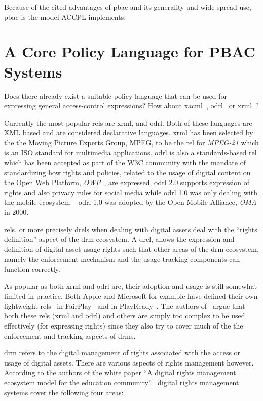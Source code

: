 \documentclass[runningheads,a4paper]{llncs}
\begin{document}
Because of the cited advantages of \ac{pbac} and its generality and wide spread use, \ac{pbac} is the model \ac{ACCPL} implements.

\section{A Core Policy Language for PBAC Systems} 

Does there already exist a suitable policy language that can be used for expressing general access-control expressions? How about \ac{xacml}~\cite{xacml3pdf}, \ac{odrl}~\cite{odrloneone} or \ac{xrml}~\cite{Wang}? 

Currently the most popular \ac{rel}s are \ac{xrml}, and \ac{odrl}. Both of these languages are XML based and are considered declarative languages. \ac{xrml} has been selected by the the Moving Picture Experts Group, MPEG, to be the \ac{rel} for \emph{MPEG-21} which is an ISO standard for multimedia applications. \ac{odrl} is also a standards-based \ac{rel} which has been accepted as part of the W3C community with the mandate of standardizing how rights and policies, related to the usage of digital content on the Open Web Platform, \emph{OWP}~\cite{openwebplatform}, are expressed. \ac{odrl} 2.0 supports expression of rights and also privacy rules for social media while \ac{odrl} 1.0 was only dealing with the mobile ecosystem -- \ac{odrl} 1.0 was adopted by the Open Mobile Alliance, \emph{OMA} in 2000.

\ac{rel}s, or more precisely \ac{drel}s when dealing with digital assets deal with the ``rights definition'' aspect of the \ac{drm} ecosystem. A \ac{drel}, allows the expression and definition of digital asset usage rights such that other areas of the \ac{drm} ecosystem, namely the enforcement mechanism and the usage tracking components can function correctly.

As popular as both \ac{xrml} and \ac{odrl} are, their adoption and usage is still somewhat limited in practice. Both Apple and Microsoft for example have defined their own lightweight \ac{rel}s~\cite{problemwithrels} in FairPlay~\cite{fairplay} and in PlayReady~\cite{playready}. The authors of~\cite{problemwithrels} argue that both these \ac{rel}s (\ac{xrml} and \ac{odrl}) and others are simply too complex to be used effectively (for expressing rights) since they also try to cover much of the the enforcement and tracking aspects of \ac{drm}s.

\ac{drm} refers to the digital management of rights associated with the access or usage of digital assets. There are various aspects of rights management however. According to the authors of the white paper ``A digital rights management ecosystem model for the education community''~\cite{collier} digital rights management systems cover the following four areas: 
\end{document}
